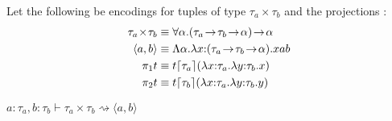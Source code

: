 Let the following be encodings for tuples of type $\tau_a\!\times\!\tau_b$ and the projections :
\begin{align*}
\tau_a\!\times\!\tau_b &\equiv \forall\alpha.(\tau_a\!\to\!\tau_b\!\to\!\alpha)\!\to\! \alpha\\
\langle a,b\rangle &\equiv \Lambda\alpha.\lam x{:}(\tau_a\!\to\!\tau_b\!\to\!\alpha).xab\\
\pi_1t &\equiv t\lceil\tau_a\rceil(\lam x{:}\tau_a.\lam y{:}\tau_b.x)\\
\pi_2t &\equiv t\lceil\tau_b\rceil(\lam x{:}\tau_a.\lam y{:}\tau_b.y)
\end{align*}

\begin{lemma}
$a{:}\tau_a, b{:}\tau_b \vdash \tau_a\!\times\!\tau_b \rightsquigarrow \langle a,b\rangle$
\end{lemma}
